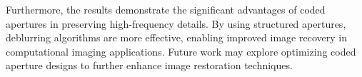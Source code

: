 \documentclass[a4paper,10pt]{article}
\begin{document}
Furthermore, the results demonstrate the significant advantages of coded apertures in preserving high-frequency details. By using structured apertures, deblurring algorithms are more effective, enabling improved image recovery in computational imaging applications. Future work may explore optimizing coded aperture designs to further enhance image restoration techniques.
\end{document}
